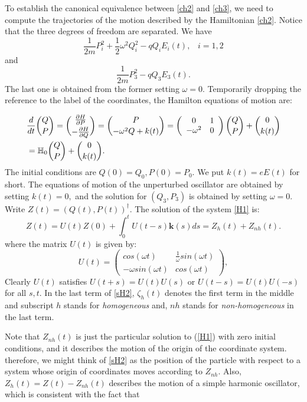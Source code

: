 \documentclass[12pt]{article}
\numberwithin{equation}{section}
\def\bk{{\boldsymbol k}}
\def\bbH{{\mathbb H}}
\begin{document}
To establish the canonical equivalence between \eqref{ch2} and \eqref{ch3}, we need to compute the trajectories of the motion described by the Hamiltonian \eqref{ch2}. Notice that the three degrees of freedom are separated. We have
$$\frac{1}{2m}P_i^2 +  \frac{1}{2}\omega^2 Q_i^2  - q Q_iE_i(t),\;\;\;i=1,2$$
and
$$\frac{1}{2m}P_3^2 - q Q_3E_3(t).$$
The last one is obtained from the former setting $\omega=0.$ Temporarily dropping the reference to the label of the coordinates, the Hamilton equations of motion are:

\begin{equation}\label{H1}
\begin{aligned}
&\frac{d}{dt}{Q \atopwithdelims ( ) P} = {\frac{\partial H}{\partial P} \atopwithdelims ( ) -\frac{\partial H}{\partial Q}} = {P \atopwithdelims ( ) -\omega^2 Q+k(t)} =
\left(\begin{array}{cc}
	0 & 1\\
-\omega^2 & 0\end{array}\right){Q \atopwithdelims ( ) P} +{0\atopwithdelims ( )k(t)}\\
& =\bbH_0{Q \atopwithdelims ( ) P} +{0\atopwithdelims ( )k(t)}.	
\end{aligned}
\end{equation}
The initial conditions are $Q(0)=Q_0, P(0)=P_0.$ We put $k(t)=eE(t)$ for short. The equations of motion of the unperturbed oscillator are obtained by setting $k(t)=0,$ and the solution for $(Q_3, P_3)$ is obtained by setting $\omega=0.$ Write $Z(t)=(Q(t),P(t))^\dag.$ The solution of the system \eqref{H1} is:
\begin{equation}\label{sH2}
Z(t) = U(t)Z(0) + \int_0^tU(t-s)\bk(s)ds = Z_h(t) + Z_{nh}(t).
\end{equation}
where the matrix $U(t)$ is given by:
\begin{equation}\label{sH2.1}
U(t) = \left(\begin{array}{cc}
	cos(\omega t) & \frac{1}{\omega}sin(\omega t)\\
-\omega sin(\omega t) & cos(\omega t)\end{array}\right),
\end{equation}
Clearly $U(t)$ satisfies $U(t+s)=U(t)U(s)$ or $U(t-s)=U(t)U(-s)$ for all $s,t.$ In the last term of \eqref{sH2}, $\zeta_h(t)$ denotes the first term in the middle and subscript $h$ stands for {\it homogeneous} and, $nh$ stands for {\it non-homogeneous} in the last term. 

Note that $Z_{nh}(t)$ is just the particular solution to (\ref{H1}) with zero initial conditions, and it describes the motion of the origin of the coordinate system. therefore, we might think of \eqref{sH2} as the position of the particle with respect to a system whose origin of coordinates moves according to $Z_{nh}.$ Also, $Z_h(t)=Z(t)-Z_{nh}(t)$ describes the motion of a simple harmonic oscillator, which is consistent with the fact that
\end{document}
